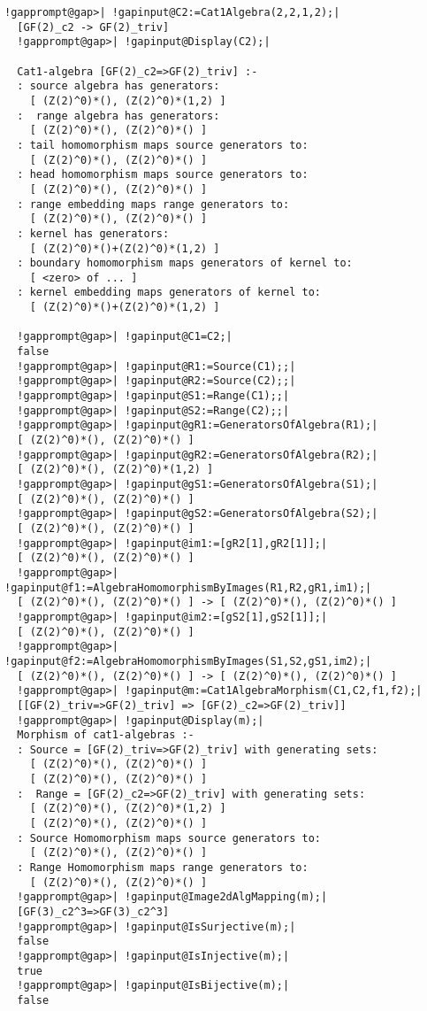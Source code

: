 \documentclass[a4paper,11pt]{report}
\begin{document}
{{\begin{Verbatim}[commandchars=!@|,fontsize=\small,frame=single,label=Example]
  !gapprompt@gap>| !gapinput@C2:=Cat1Algebra(2,2,1,2);|
  [GF(2)_c2 -> GF(2)_triv]
  !gapprompt@gap>| !gapinput@Display(C2);|
  
  Cat1-algebra [GF(2)_c2=>GF(2)_triv] :-
  : source algebra has generators:
    [ (Z(2)^0)*(), (Z(2)^0)*(1,2) ]
  :  range algebra has generators:
    [ (Z(2)^0)*(), (Z(2)^0)*() ]
  : tail homomorphism maps source generators to:
    [ (Z(2)^0)*(), (Z(2)^0)*() ]
  : head homomorphism maps source generators to:
    [ (Z(2)^0)*(), (Z(2)^0)*() ]
  : range embedding maps range generators to:
    [ (Z(2)^0)*(), (Z(2)^0)*() ]
  : kernel has generators:
    [ (Z(2)^0)*()+(Z(2)^0)*(1,2) ]
  : boundary homomorphism maps generators of kernel to:
    [ <zero> of ... ]
  : kernel embedding maps generators of kernel to:
    [ (Z(2)^0)*()+(Z(2)^0)*(1,2) ]
  
  !gapprompt@gap>| !gapinput@C1=C2;|
  false
  !gapprompt@gap>| !gapinput@R1:=Source(C1);;|
  !gapprompt@gap>| !gapinput@R2:=Source(C2);;|
  !gapprompt@gap>| !gapinput@S1:=Range(C1);;|
  !gapprompt@gap>| !gapinput@S2:=Range(C2);;|
  !gapprompt@gap>| !gapinput@gR1:=GeneratorsOfAlgebra(R1);|
  [ (Z(2)^0)*(), (Z(2)^0)*() ]
  !gapprompt@gap>| !gapinput@gR2:=GeneratorsOfAlgebra(R2);|
  [ (Z(2)^0)*(), (Z(2)^0)*(1,2) ]
  !gapprompt@gap>| !gapinput@gS1:=GeneratorsOfAlgebra(S1);|
  [ (Z(2)^0)*(), (Z(2)^0)*() ]
  !gapprompt@gap>| !gapinput@gS2:=GeneratorsOfAlgebra(S2);|
  [ (Z(2)^0)*(), (Z(2)^0)*() ]
  !gapprompt@gap>| !gapinput@im1:=[gR2[1],gR2[1]];|
  [ (Z(2)^0)*(), (Z(2)^0)*() ]
  !gapprompt@gap>| !gapinput@f1:=AlgebraHomomorphismByImages(R1,R2,gR1,im1);|
  [ (Z(2)^0)*(), (Z(2)^0)*() ] -> [ (Z(2)^0)*(), (Z(2)^0)*() ]
  !gapprompt@gap>| !gapinput@im2:=[gS2[1],gS2[1]];|
  [ (Z(2)^0)*(), (Z(2)^0)*() ]
  !gapprompt@gap>| !gapinput@f2:=AlgebraHomomorphismByImages(S1,S2,gS1,im2);|
  [ (Z(2)^0)*(), (Z(2)^0)*() ] -> [ (Z(2)^0)*(), (Z(2)^0)*() ]
  !gapprompt@gap>| !gapinput@m:=Cat1AlgebraMorphism(C1,C2,f1,f2);|
  [[GF(2)_triv=>GF(2)_triv] => [GF(2)_c2=>GF(2)_triv]]
  !gapprompt@gap>| !gapinput@Display(m);|
  Morphism of cat1-algebras :-
  : Source = [GF(2)_triv=>GF(2)_triv] with generating sets:
    [ (Z(2)^0)*(), (Z(2)^0)*() ]
    [ (Z(2)^0)*(), (Z(2)^0)*() ]
  :  Range = [GF(2)_c2=>GF(2)_triv] with generating sets:
    [ (Z(2)^0)*(), (Z(2)^0)*(1,2) ]
    [ (Z(2)^0)*(), (Z(2)^0)*() ]
  : Source Homomorphism maps source generators to:
    [ (Z(2)^0)*(), (Z(2)^0)*() ]
  : Range Homomorphism maps range generators to:
    [ (Z(2)^0)*(), (Z(2)^0)*() ]
  !gapprompt@gap>| !gapinput@Image2dAlgMapping(m);|
  [GF(3)_c2^3=>GF(3)_c2^3]
  !gapprompt@gap>| !gapinput@IsSurjective(m);|
  false
  !gapprompt@gap>| !gapinput@IsInjective(m);|
  true
  !gapprompt@gap>| !gapinput@IsBijective(m);|
  false
  

\end{Verbatim}}}
\end{document}
